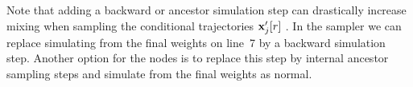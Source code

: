 \noindent Note that adding a backward or ancestor simulation step can drastically increase mixing when sampling the conditional trajectories $\mathbf{x}_j'[r]$ \citep{lindsten2013backward}. In the \ipmcmc sampler we can replace simulating from the final weights on line~7 by a backward simulation step. Another option for the \csmc nodes is to replace this step by internal ancestor sampling \citep{lindstenJS2014} steps and simulate from the final weights as normal.



